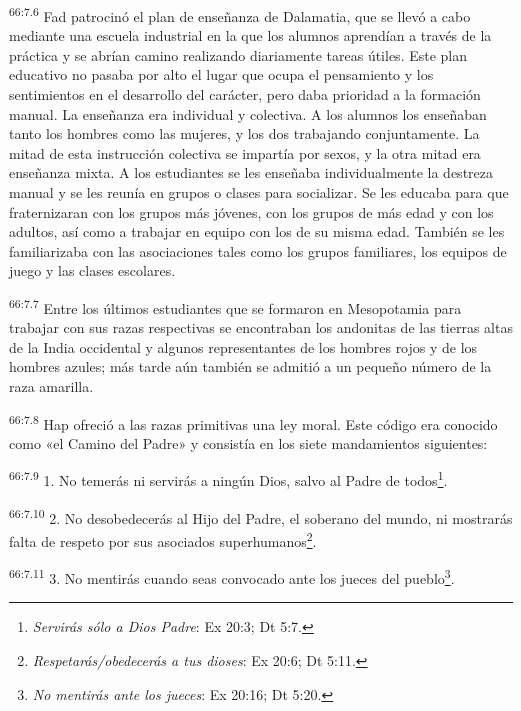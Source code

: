 \par
\textsuperscript{66:7.6} Fad patrocinó el plan de enseñanza de Dalamatia, que se llevó a cabo mediante una escuela industrial en la que los alumnos aprendían a través de la práctica y se abrían camino realizando diariamente tareas útiles. Este plan educativo no pasaba por alto el lugar que ocupa el pensamiento y los sentimientos en el desarrollo del carácter, pero daba prioridad a la formación manual. La enseñanza era individual y colectiva. A los alumnos los enseñaban tanto los hombres como las mujeres, y los dos trabajando conjuntamente. La mitad de esta instrucción colectiva se impartía por sexos, y la otra mitad era enseñanza mixta. A los estudiantes se les enseñaba individualmente la destreza manual y se les reunía en grupos o clases para socializar. Se les educaba para que fraternizaran con los grupos más jóvenes, con los grupos de más edad y con los adultos, así como a trabajar en equipo con los de su misma edad. También se les familiarizaba con las asociaciones tales como los grupos familiares, los equipos de juego y las clases escolares.

\par
\textsuperscript{66:7.7} Entre los últimos estudiantes que se formaron en Mesopotamia para trabajar con sus razas respectivas se encontraban los andonitas de las tierras altas de la India occidental y algunos representantes de los hombres rojos y de los hombres azules; más tarde aún también se admitió a un pequeño número de la raza amarilla.

\par
\textsuperscript{66:7.8} Hap ofreció a las razas primitivas una ley moral. Este código era conocido como «el Camino del Padre» y consistía en los siete mandamientos siguientes:

\par
\textsuperscript{66:7.9} 1. No temerás ni servirás a ningún Dios, salvo al Padre de todos\footnote{\textit{Servirás sólo a Dios Padre}: Ex 20:3; Dt 5:7.}.

\par
\textsuperscript{66:7.10} 2. No desobedecerás al Hijo del Padre, el soberano del mundo, ni mostrarás falta de respeto por sus asociados superhumanos\footnote{\textit{Respetarás/obedecerás a tus dioses}: Ex 20:6; Dt 5:11.}.

\par
\textsuperscript{66:7.11} 3. No mentirás cuando seas convocado ante los jueces del pueblo\footnote{\textit{No mentirás ante los jueces}: Ex 20:16; Dt 5:20.}.

